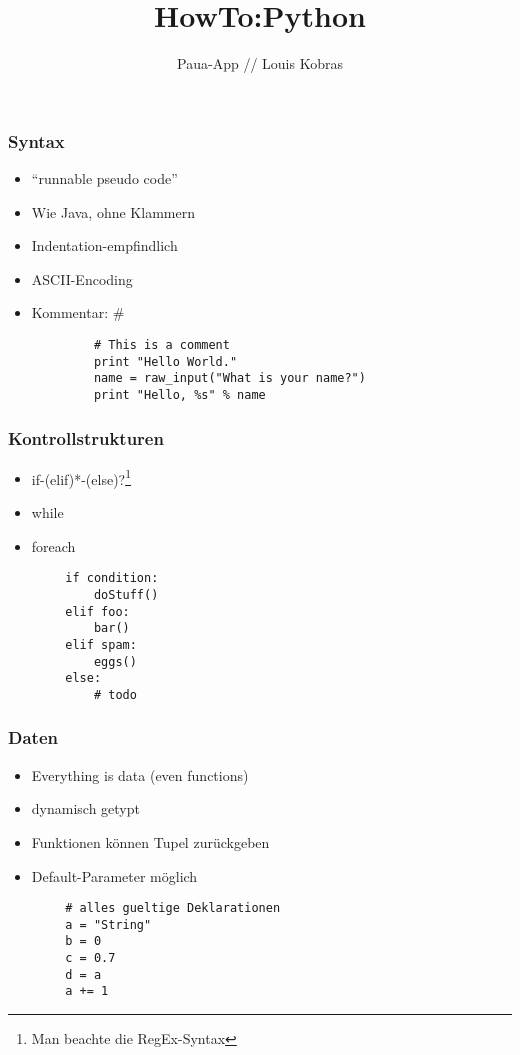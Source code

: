 \documentclass{beamer}
\title{HowTo:Python}
\author{Paua-App // Louis Kobras}
\begin{document}
\begin{frame}
	\maketitle
\end{frame}
\begin{frame}[fragile]
	\frametitle{Syntax}
	\begin{itemize}
		\item ``runnable pseudo code''
		\item Wie Java, ohne Klammern
		\item Indentation-empfindlich
		\item ASCII-Encoding
		\item Kommentar: \#
	\end{itemize}
	\pause
		\begin{lstlisting}
			# This is a comment
			print "Hello World."
			name = raw_input("What is your name?")
			print "Hello, %s" % name
		\end{lstlisting}
\end{frame}


\begin{frame}[fragile]
	\frametitle{Kontrollstrukturen}
	\begin{itemize}
		\item if-(elif)*-(else)?\footnote{Man beachte die RegEx-Syntax}
		\item while
		\item foreach
	\end{itemize}
	\pause
	\begin{lstlisting}
		if condition:
    		doStuff()
		elif foo:
		    bar()
		elif spam:
		    eggs()
		else:
		    # todo
	\end{lstlisting}
\end{frame}

\begin{frame}[fragile]
	\frametitle{Daten}
	\begin{itemize}
		\item Everything is data (even functions)
		\item dynamisch getypt
		\item Funktionen können Tupel zurückgeben
		\item Default-Parameter möglich
	\end{itemize}
	\pause
	\begin{lstlisting}
		# alles gueltige Deklarationen
		a = "String"
		b = 0
		c = 0.7
		d = a
		a += 1
	\end{lstlisting}
\end{frame}
\end{document}
